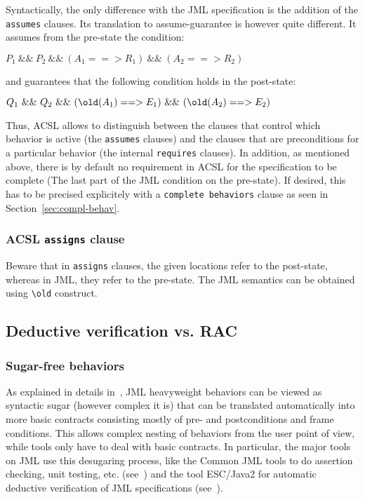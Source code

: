 \noindent
Syntactically, the only difference with the JML specification is the
addition of the \verb|assumes| clauses.
Its translation to assume-guarantee is however quite different.
It assumes from the pre-state the condition:

\begin{center}
{\ttfamily $P_1 ~\&\&~ P_2 ~\&\&~
  (A_1 ==> R_1) ~\&\&~ (A_2 ==> R_2)$}
\end{center}

\noindent
and guarantees that the following condition holds in the post-state:

\begin{center}
{\ttfamily $Q_1 ~\&\&~ Q_2 ~\&\&~
  (\texttt{{\textbackslash}old}(A_1) ==> E_1) ~\&\&~ (\texttt{{\textbackslash}old}(A_2) ==> E_2)$}
\end{center}

Thus, ACSL allows to distinguish between the clauses that control
which behavior is active (the \texttt{assumes} clauses) and the
clauses that are preconditions for a particular behavior (the internal
\texttt{requires} clauses). In addition, as mentioned above, there is
by default no requirement in ACSL for the specification to be complete (The
last part of the JML condition on the pre-state). If desired, this has
to be precised explicitely with a \verb+complete behaviors+ clause as
seen in Section~\ref{sec:compl-behav}.

\subsubsection*{ACSL \texttt{assigns} clause}

Beware that in \texttt{assigns} clauses, the given locations refer to
the post-state, whereas in JML, they refer to the pre-state. The JML
semantics can be obtained using \verb|\old| construct.

\subsection{Deductive verification vs. RAC}

\subsubsection*{Sugar-free behaviors}

As explained in details in~\cite{raghavan00desugaring}, JML
heavyweight behaviors can be viewed as syntactic sugar (however
complex it is) that can be translated automatically into more basic
contracts consisting mostly of pre- and postconditions and frame
conditions.  This allows complex nesting of behaviors from the user
point of view, while tools only have to deal with basic contracts. In
particular, the major tools on JML use this desugaring process, like
the Common JML tools to do assertion checking, unit testing,
etc. (see~\cite{leavens00jml}) and the tool ESC/Java2 for
automatic deductive verification of JML specifications
(see~\cite{kiriny07implnotes}).

